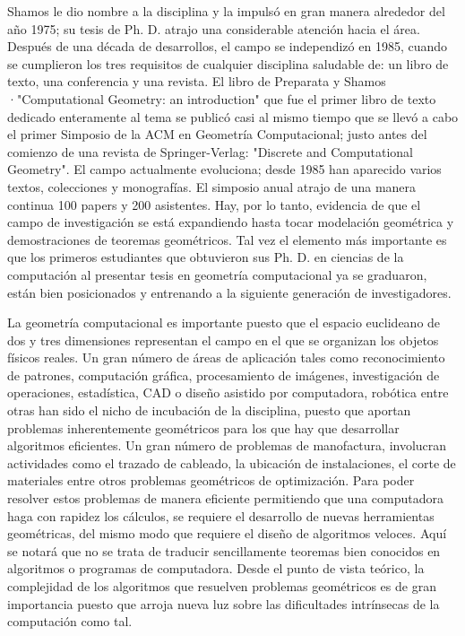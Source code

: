 \documentclass[final, 12pt letterpaper]{article}
\begin{document}
Shamos le dio nombre a la disciplina y la impulsó en gran manera alrededor del año 1975; su tesis de Ph. D. atrajo una considerable atención hacia el área. Después de una década de desarrollos, el campo se independizó en 1985, cuando se cumplieron los tres requisitos de cualquier disciplina saludable de: un libro de texto, una conferencia y una revista. El libro de Preparata y Shamos ·"Computational Geometry: an introduction" que fue el primer libro de texto dedicado enteramente al tema se publicó casi al mismo tiempo que se llevó a cabo el primer Simposio de la ACM en Geometría Computacional; justo antes del comienzo de una revista de Springer-Verlag: "Discrete and Computational Geometry". El campo actualmente evoluciona; desde 1985 han aparecido varios textos, colecciones y monografías. El simposio anual atrajo de una manera continua 100 papers y 200 asistentes. Hay, por lo tanto, evidencia de que el campo de investigación se está expandiendo hasta tocar modelación geométrica y demostraciones de teoremas geométricos. Tal vez el elemento más importante es que los primeros estudiantes que obtuvieron sus Ph. D. en ciencias de la computación al presentar tesis en geometría computacional ya se graduaron, están bien posicionados y entrenando a la siguiente generación de investigadores.\medskip

La geometría computacional es importante puesto que el espacio euclideano de dos y tres dimensiones representan el campo en el que se organizan los objetos físicos reales. Un gran número de áreas de aplicación tales como reconocimiento de patrones, computación gráfica, procesamiento de imágenes, investigación de operaciones, estadística, CAD o diseño asistido por computadora, robótica entre otras han sido el nicho de incubación de la disciplina, puesto que aportan problemas inherentemente geométricos para los que hay que desarrollar algoritmos eficientes. Un gran número de problemas de manofactura, involucran actividades como el trazado de cableado, la ubicación de instalaciones, el corte de materiales entre otros problemas geométricos de optimización. Para poder resolver estos problemas de manera eficiente permitiendo que una computadora haga con rapidez los cálculos, se requiere el desarrollo de nuevas herramientas geométricas, del mismo modo que requiere el diseño de algoritmos  veloces. Aquí se notará que no se trata de traducir sencillamente teoremas bien conocidos en algoritmos o programas de computadora. Desde el punto de vista teórico, la complejidad de los algoritmos que resuelven problemas geométricos es de gran importancia puesto que arroja nueva luz sobre las dificultades intrínsecas de la computación como tal.
\clearpage
\end{document}
